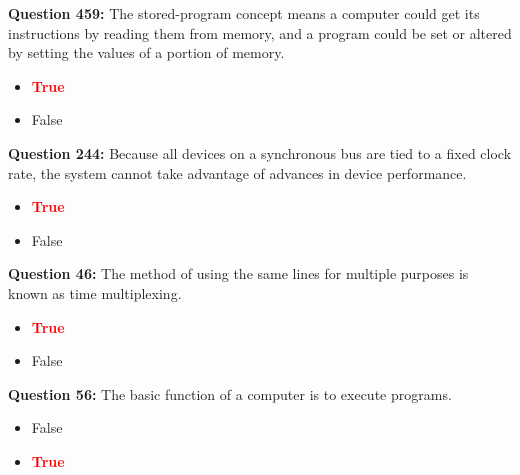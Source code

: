 \documentclass[12pt,a4paper]{article}
\begin{document}
\vspace{0.5cm}

\vspace{0.5cm}

\textbf{Question 459:} The stored-program concept means a computer could get its instructions by reading them from memory, and a program could be set or altered by setting the values of a portion of memory.

\begin{itemize}
    \item[\textbf{A.}] \textcolor{red}{\textbf{True}}
    \item[\textbf{B.}] False
\end{itemize}

\vspace{0.5cm}

\vspace{0.5cm}

\textbf{Question 244:} Because all devices on a synchronous bus are tied to a fixed clock rate, the system cannot take advantage of advances in device performance.

\begin{itemize}
    \item[\textbf{A.}] \textcolor{red}{\textbf{True}}
    \item[\textbf{B.}] False
\end{itemize}

\vspace{0.5cm}

\vspace{0.5cm}

\textbf{Question 46:} The method of using the same lines for multiple purposes is known as time multiplexing.

\begin{itemize}
    \item[\textbf{A.}] \textcolor{red}{\textbf{True}}
    \item[\textbf{B.}] False
\end{itemize}

\vspace{0.5cm}

\vspace{0.5cm}

\textbf{Question 56:} The basic function of a computer is to execute programs.

\begin{itemize}
    \item[\textbf{A.}] False
    \item[\textbf{B.}] \textcolor{red}{\textbf{True}}
\end{itemize}
\end{document}
